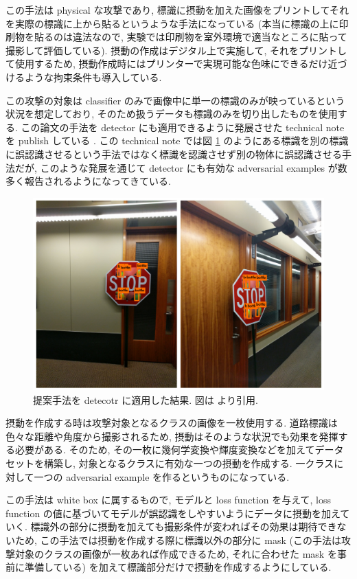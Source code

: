 この手法は physical な攻撃であり, 標識に摂動を加えた画像をプリントしてそれを実際の標識に上から貼るというような手法になっている (本当に標識の上に印刷物を貼るのは違法なので, 実験では印刷物を室外環境で適当なところに貼って撮影して評価している).
摂動の作成はデジタル上で実施して, それをプリントして使用するため, 摂動作成時にはプリンターで実現可能な色味にできるだけ近づけるような拘束条件も導入している.

この攻撃の対象は classifier のみで画像中に単一の標識のみが映っているという状況を想定しており, そのため扱うデータも標識のみを切り出したものを使用する.
この論文の手法を detector にも適用できるように発展させた technical note を publish している \cite{eykholt2017note}.
この technical note では図 \ref{fig:robust-physical-detector} のようにある標識を別の標識に誤認識させるという手法ではなく標識を認識させず別の物体に誤認識させる手法だが, このような発展を通じて detector にも有効な adversarial examples が数多く報告されるようになってきている.
%
\begin{figure}[htbp]
\begin{center}
\includegraphics[width=12.0cm]{figures/robust-physical-detector.pdf}
\end{center}
\caption{
提案手法を detecotr に適用した結果.
図は \cite{eykholt2017note} より引用.
}
\label{fig:robust-physical-detector}
\end{figure}
%

摂動を作成する時は攻撃対象となるクラスの画像を一枚使用する.
道路標識は色々な距離や角度から撮影されるため, 摂動はそのような状況でも効果を発揮する必要がある.
そのため, その一枚に幾何学変換や輝度変換などを加えてデータセットを構築し, 対象となるクラスに有効な一つの摂動を作成する.
一クラスに対して一つの adversarial example を作るというものになっている.

この手法は white box に属するもので, モデルと loss function を与えて, loss function の値に基づいてモデルが誤認識をしやすいようにデータに摂動を加えていく.
標識外の部分に摂動を加えても撮影条件が変わればその効果は期待できないため, この手法では摂動を作成する際に標識以外の部分に mask  (この手法は攻撃対象のクラスの画像が一枚あれば作成できるため, それに合わせた mask を事前に準備している) を加えて標識部分だけで摂動を作成するようにしている.

